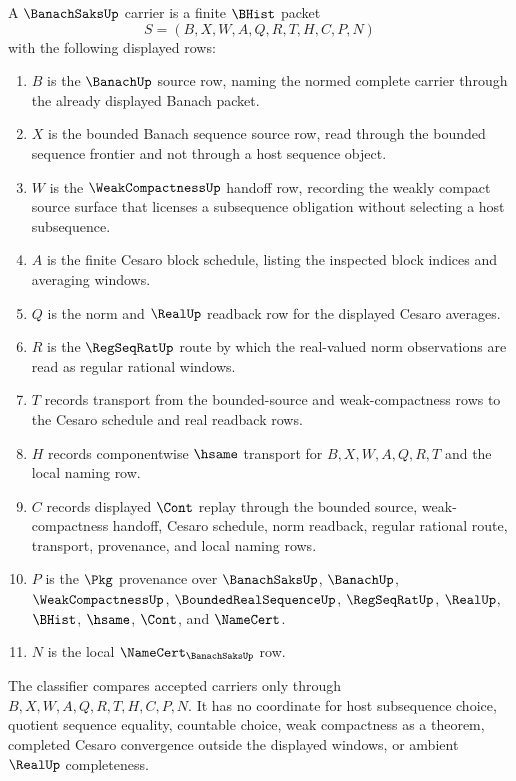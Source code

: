 \begin{definition}
\label{def:banach-saks-carrier}
A $\BanachSaksUp$ carrier is a finite $\BHist$ packet
$$
S=(B,X,W,A,Q,R,T,H,C,P,N)
$$
with the following displayed rows:
\begin{enumerate}
\item $B$ is the $\BanachUp$ source row, naming the normed complete carrier through the already displayed Banach packet.
\item $X$ is the bounded Banach sequence source row, read through the bounded sequence frontier and not through a host sequence object.
\item $W$ is the $\WeakCompactnessUp$ handoff row, recording the weakly compact source surface that licenses a subsequence obligation without selecting a host subsequence.
\item $A$ is the finite Cesaro block schedule, listing the inspected block indices and averaging windows.
\item $Q$ is the norm and $\RealUp$ readback row for the displayed Cesaro averages.
\item $R$ is the $\RegSeqRatUp$ route by which the real-valued norm observations are read as regular rational windows.
\item $T$ records transport from the bounded-source and weak-compactness rows to the Cesaro schedule and real readback rows.
\item $H$ records componentwise $\hsame$ transport for $B,X,W,A,Q,R,T$ and the local naming row.
\item $C$ records displayed $\Cont$ replay through the bounded source, weak-compactness handoff, Cesaro schedule, norm readback, regular rational route, transport, provenance, and local naming rows.
\item $P$ is the $\Pkg$ provenance over $\BanachSaksUp$, $\BanachUp$, $\WeakCompactnessUp$, $\BoundedRealSequenceUp$, $\RegSeqRatUp$, $\RealUp$, $\BHist$, $\hsame$, $\Cont$, and $\NameCert$.
\item $N$ is the local $\NameCert_{\BanachSaksUp}$ row.
\end{enumerate}
The classifier compares accepted carriers only through $B,X,W,A,Q,R,T,H,C,P,N$. It has no coordinate for host subsequence choice, quotient sequence equality, countable choice, weak compactness as a theorem, completed Cesaro convergence outside the displayed windows, or ambient $\RealUp$ completeness.
\end{definition}

